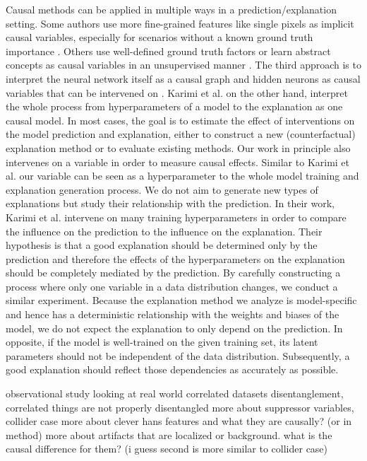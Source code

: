 Causal methods can be applied in multiple ways in a prediction/explanation setting.
Some authors use more fine-grained features like single pixels as implicit causal variables, especially for scenarios without a known ground truth importance \cite{Zeiler2013,Fong2017,Samek2017a}. Others use well-defined ground truth factors or learn abstract concepts as causal variables in an unsupervised manner \cite{Goyal2019, Tran2022, Reimers2019, Reimers2020, Harradon2018}. The third approach is to interpret the neural network itself as a causal graph and hidden neurons as causal variables that can be intervened on \cite{Narendra2018, Chattopadhyay2019}. Karimi et al. \cite{Karimi2023} on the other hand, interpret the whole process from hyperparameters of a model to the explanation as one causal model. 
In most cases, the goal is to estimate the effect of interventions on the model prediction and explanation, either to construct a new (counterfactual) explanation method or to evaluate existing methods.
Our work in principle also intervenes on a variable in order to measure causal effects. Similar to Karimi et al. \cite{Karimi2023} our variable can be seen as a hyperparameter to the whole model training and explanation generation process. We do not aim to generate new types of explanations but study their relationship with the prediction. In their work, Karimi et al. intervene on many training hyperparameters in order to compare the influence on the prediction to the influence on the explanation. Their hypothesis is that a good explanation should be determined only by the prediction and therefore the effects of the hyperparameters on the explanation should be completely mediated by the prediction. By carefully constructing a process where only one variable in a data distribution changes, we conduct a similar experiment. Because the explanation method we analyze is model-specific and hence has a deterministic relationship with the weights and biases of the model, we do not expect the explanation to only depend on the prediction. In opposite, if the model is well-trained on the given training set, its latent parameters should not be independent of the data distribution. Subsequently, a good explanation should reflect those dependencies as accurately as possible. 

{\color{gray}
observational study looking at real world correlated datasets disentanglement, correlated things are not properly disentangled \cite{Traeuble2021} 
more about suppressor variables, collider case
more about clever hans features and what they are causally? (or in method)
more about artifacts that are localized or background. what is the causal difference for them? (i guess second is more similar to collider case)
}